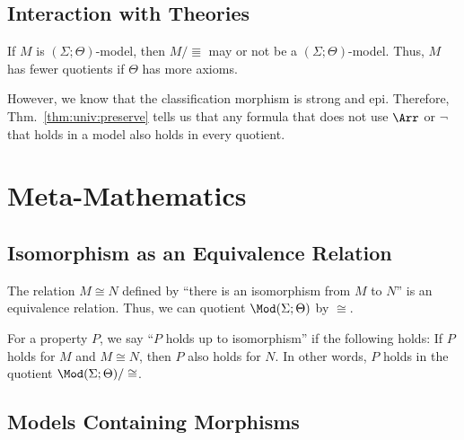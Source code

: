 \subsection{Interaction with Theories}

If $M$ is $(\Sigma;\Theta)$-model, then $M/\Equiv$ may or not be a $(\Sigma;\Theta)$-model.
Thus, $M$ has fewer quotients if $\Theta$ has more axioms.

However, we know that the classification morphism is strong and epi.
Therefore, Thm.~\ref{thm:univ:preserve} tells us that any formula that does not use $\impl$ or $\neg$ that holds in a model also holds in every quotient.

%


\section{Meta-Mathematics}\label{sec:univ:meta}

\subsection{Isomorphism as an Equivalence Relation}

The relation $M\cong N$ defined by ``there is an isomorphism from $M$ to $N$'' is an equivalence relation.
Thus, we can quotient $\Mod(\Sigma;\Theta)$ by $\cong$.

For a property $P$, we say ``$P$ holds up to isomorphism'' if the following holds: If $P$ holds for $M$ and $M\cong N$, then $P$ also holds for $N$.
In other words, $P$ holds in the quotient $\Mod(\Sigma;\Theta)/\cong$.

\subsection{Models Containing Morphisms}

